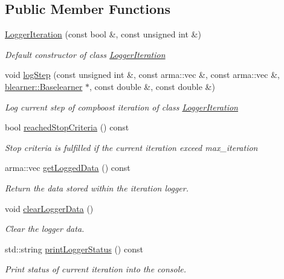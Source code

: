\subsection*{Public Member Functions}
\begin{DoxyCompactItemize}
\item 
\hyperlink{classlogger_1_1_logger_iteration_a79ab91e7e508f56cbfac3d670a79987c}{Logger\+Iteration} (const bool \&, const unsigned int \&)
\begin{DoxyCompactList}\small\item\em Default constructor of class {\ttfamily \hyperlink{classlogger_1_1_logger_iteration}{Logger\+Iteration}} \end{DoxyCompactList}\item 
void \hyperlink{classlogger_1_1_logger_iteration_a155e7fd8c8130211f54804c5ff3a054b}{log\+Step} (const unsigned int \&, const arma\+::vec \&, const arma\+::vec \&, \hyperlink{classblearner_1_1_baselearner}{blearner\+::\+Baselearner} $\ast$, const double \&, const double \&)
\begin{DoxyCompactList}\small\item\em Log current step of compboost iteration of class {\ttfamily \hyperlink{classlogger_1_1_logger_iteration}{Logger\+Iteration}} \end{DoxyCompactList}\item 
bool \hyperlink{classlogger_1_1_logger_iteration_af4cd1f0b87dcff8a88439f2ca6b07f1f}{reached\+Stop\+Criteria} () const
\begin{DoxyCompactList}\small\item\em Stop criteria is fulfilled if the current iteration exceed {\ttfamily max\+\_\+iteration} \end{DoxyCompactList}\item 
arma\+::vec \hyperlink{classlogger_1_1_logger_iteration_a2d0404feb799850420874612a435f3da}{get\+Logged\+Data} () const
\begin{DoxyCompactList}\small\item\em Return the data stored within the iteration logger. \end{DoxyCompactList}\item 
void \hyperlink{classlogger_1_1_logger_iteration_ac7c2aace3ba5f22d8f42ec078fe62602}{clear\+Logger\+Data} ()
\begin{DoxyCompactList}\small\item\em Clear the logger data. \end{DoxyCompactList}\item 
std\+::string \hyperlink{classlogger_1_1_logger_iteration_ac6283092f495a6e8c5ab357ae84cb911}{print\+Logger\+Status} () const
\begin{DoxyCompactList}\small\item\em Print status of current iteration into the console. \end{DoxyCompactList}\end{DoxyCompactItemize}
